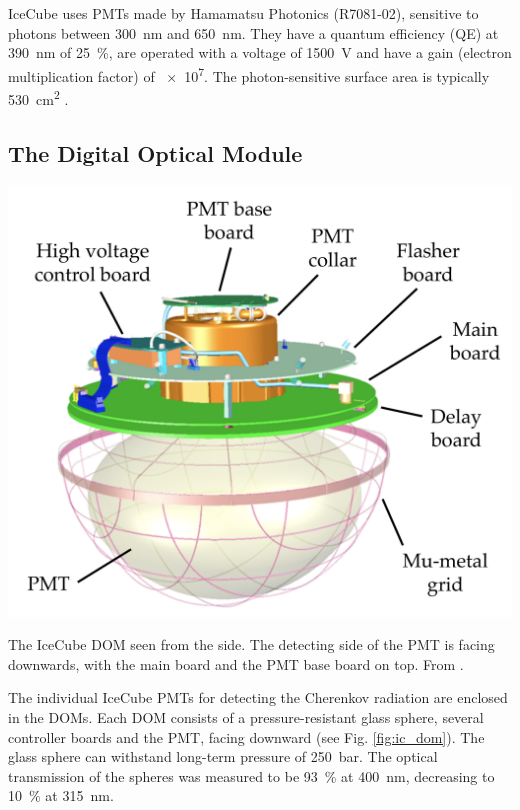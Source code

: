\documentclass[
    a4paper, %
    fontsize=10pt, %
    twoside=false, %
    numbers=noenddot, %
    fontmethod=tex,
]{kaobook}
\begin{document}
IceCube uses PMTs made by Hamamatsu Photonics (R7081-02), sensitive to photons between \SI{300}{\nm} and \SI{650}{\nm}. They have a quantum efficiency (QE) at \SI{390}{\nm} of \SI{25}{\percent}, are operated with a voltage of \SI{1500}{\V} and have a gain (electron multiplication factor) of \num{e7}. The photon-sensitive surface area is typically \SI{530}{\cm\squared} .

\subsection{The Digital Optical Module} \label{DOM}
\begin{marginfigure}
    \includegraphics{ic/ic_DOM.pdf}
    \caption[IceCube digital optical module]{The IceCube DOM seen from the side. The detecting side of the PMT is facing downwards, with the main board and the PMT base board on top. From \cite{Aartsen2017}.}
\end{marginfigure}

The individual IceCube PMTs for detecting the Cherenkov radiation are enclosed in the DOMs. Each DOM consists of a pressure-resistant glass sphere, several controller boards and the PMT, facing downward (see Fig. \ref{fig:ic_dom}). The glass sphere can withstand long-term pressure of \SI{250}{\bar}. The optical transmission of the spheres was measured to be \SI{93}{\percent} at \SI{400}{\nm}, decreasing to \SI{10}{\percent} at \SI{315}{\nm}.
\end{document}
